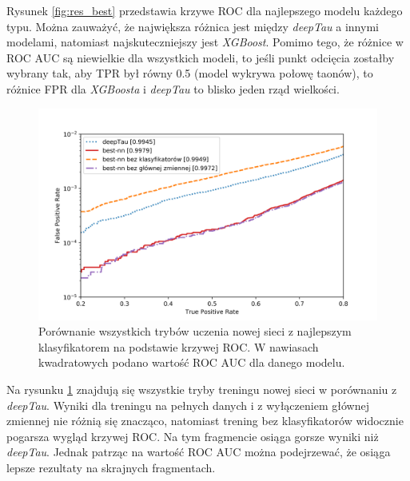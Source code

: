 \documentclass{pracalicmgr}
\begin{document}
	Rysunek \ref{fig:res_best} przedstawia krzywe ROC dla najlepszego modelu każdego typu. Można zauważyć, że największa różnica jest między \textit{deepTau} a innymi modelami, natomiast najskuteczniejszy jest \textit{XGBoost}. Pomimo tego, że różnice w ROC AUC są niewielkie dla wszystkich modeli, to jeśli punkt odcięcia zostałby wybrany tak, aby TPR był równy 0.5 (model wykrywa połowę taonów), to różnice FPR dla \textit{XGBoosta} i \textit{deepTau} to blisko jeden rząd wielkości.
	
	\begin{figure}
	\centering
	\includegraphics[width=1\textwidth]{new_network.png}
	\caption{Porównanie wszystkich trybów uczenia nowej sieci z najlepszym klasyfikatorem na podstawie krzywej ROC. W nawiasach kwadratowych podano wartość ROC AUC dla danego modelu.}
	\label{fig:res_new}	
	\end{figure}
	
	Na rysunku \ref{fig:res_new} znajdują się wszystkie tryby treningu nowej sieci w porównaniu z \textit{deepTau}. Wyniki dla treningu na pełnych danych i z wyłączeniem głównej zmiennej nie różnią się znacząco, natomiast trening bez klasyfikatorów widocznie pogarsza wygląd krzywej ROC. Na tym fragmencie osiąga gorsze wyniki niż \textit{deepTau}. Jednak patrząc na wartość ROC AUC można podejrzewać, że osiąga lepsze rezultaty na skrajnych fragmentach.
	
\end{document}
